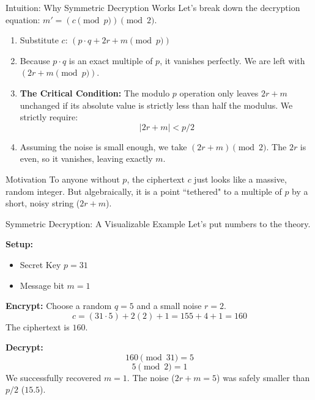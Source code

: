 \documentclass[10pt]{beamer}
\begin{document}
\begin{frame}{Intuition: Why Symmetric Decryption Works}
    Let's break down the decryption equation: $m' = (c \pmod p) \pmod 2$.
    \pause
    
    \vspace{0.3cm}
    \begin{enumerate}
        \item Substitute $c$: $(p \cdot q + 2r + m \pmod p)$
        \pause
        \item Because $p \cdot q$ is an exact multiple of $p$, it vanishes perfectly. We are left with $(2r + m \pmod p)$.
        \pause
        \item \textbf{The Critical Condition:} The modulo $p$ operation only leaves $2r+m$ unchanged if its absolute value is strictly less than half the modulus. We strictly require:
        $$|2r + m| < p/2$$
        \pause
        \item Assuming the noise is small enough, we take $(2r + m) \pmod 2$. The $2r$ is even, so it vanishes, leaving exactly $m$.
    \end{enumerate}
    \pause
    
    \begin{block}{Motivation}
    To anyone without $p$, the ciphertext $c$ just looks like a massive, random integer. But algebraically, it is a point ``tethered" to a multiple of $p$ by a short, noisy string ($2r+m$).
    \end{block}
\end{frame}

\begin{frame}{Symmetric Decryption: A Visualizable Example}
    Let's put numbers to the theory.
    
    \vspace{0.2cm}
    \textbf{Setup:}
    \begin{itemize}
        \item Secret Key $p = 31$
        \item Message bit $m = 1$
    \end{itemize}
    \pause
    
    \textbf{Encrypt:}
    Choose a random $q = 5$ and a small noise $r = 2$.
    $$c = (31 \cdot 5) + 2(2) + 1 = 155 + 4 + 1 = 160$$
    The ciphertext is $160$.
    \pause
    
    \vspace{0.2cm}
    \textbf{Decrypt:}
    $$160 \pmod{31} = 5$$
    $$5 \pmod 2 = 1$$
    We successfully recovered $m = 1$. The noise ($2r+m = 5$) was safely smaller than $p/2$ ($15.5$).
\end{frame}
\end{document}
